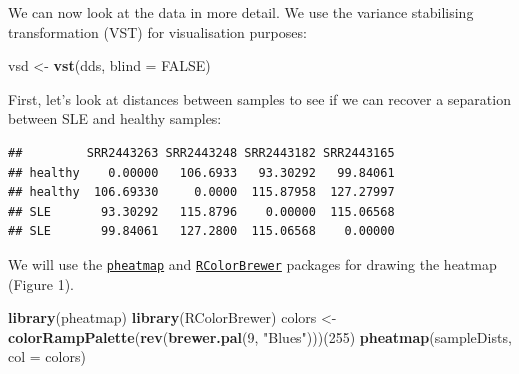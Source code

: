 \documentclass[9pt,a4paper,]{extarticle}
\newenvironment{Shaded}{\begin{snugshade}}{\end{snugshade}}
\newcommand{\KeywordTok}[1]{\textcolor[rgb]{0.13,0.29,0.53}{\textbf{#1}}}
\newcommand{\DataTypeTok}[1]{\textcolor[rgb]{0.13,0.29,0.53}{#1}}
\newcommand{\DecValTok}[1]{\textcolor[rgb]{0.00,0.00,0.81}{#1}}
\newcommand{\StringTok}[1]{\textcolor[rgb]{0.31,0.60,0.02}{#1}}
\newcommand{\OtherTok}[1]{\textcolor[rgb]{0.56,0.35,0.01}{#1}}
\newcommand{\OperatorTok}[1]{\textcolor[rgb]{0.81,0.36,0.00}{\textbf{#1}}}
\newcommand{\NormalTok}[1]{#1}
\begin{document}
We can now look at the data in more detail.
We use the variance stabilising transformation (VST) \citep{Anders2010} for visualisation purposes:

\begin{Shaded}
\begin{Highlighting}[]
\NormalTok{vsd <-}\StringTok{ }\KeywordTok{vst}\NormalTok{(dds, }\DataTypeTok{blind =} \OtherTok{FALSE}\NormalTok{)}
\end{Highlighting}
\end{Shaded}

First, let's look at distances between samples to see if we can recover a separation between SLE and healthy samples:

\begin{Shaded}
\end{Shaded}

\begin{verbatim}
##         SRR2443263 SRR2443248 SRR2443182 SRR2443165
## healthy    0.00000   106.6933   93.30292   99.84061
## healthy  106.69330     0.0000  115.87958  127.27997
## SLE       93.30292   115.8796    0.00000  115.06568
## SLE       99.84061   127.2800  115.06568    0.00000
\end{verbatim}

We will use the \href{http://cran.r-project.org/package=pheatmap}{\texttt{pheatmap}} and \href{https://cran.r-project.org/package=RColorBrewer}{\texttt{RColorBrewer}} packages for drawing the heatmap (Figure 1).

\begin{Shaded}
\begin{Highlighting}[]
\KeywordTok{library}\NormalTok{(pheatmap)}
\KeywordTok{library}\NormalTok{(RColorBrewer)}
\NormalTok{colors <-}\StringTok{ }\KeywordTok{colorRampPalette}\NormalTok{(}\KeywordTok{rev}\NormalTok{(}\KeywordTok{brewer.pal}\NormalTok{(}\DecValTok{9}\NormalTok{, }\StringTok{"Blues"}\NormalTok{)))(}\DecValTok{255}\NormalTok{)}
\KeywordTok{pheatmap}\NormalTok{(sampleDists, }\DataTypeTok{col =}\NormalTok{ colors)}
\end{Highlighting}
\end{Shaded}
\end{document}

